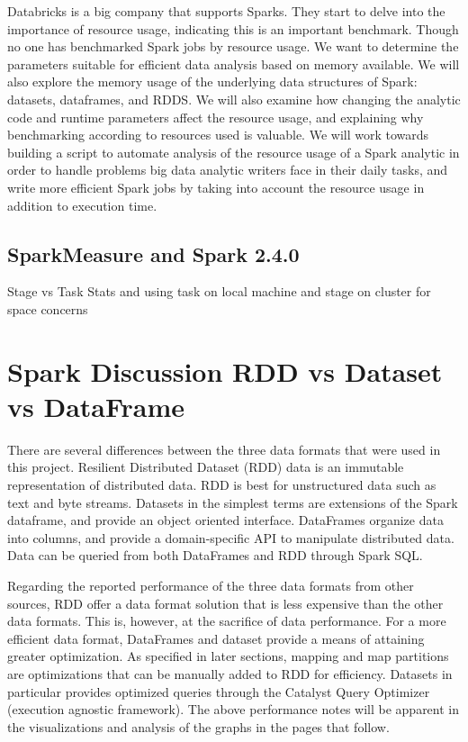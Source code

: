 \documentclass[conference]{IEEEtran}
\begin{document}

Databricks is a big company that supports Sparks. They start to delve into the importance of resource usage, indicating this is an important benchmark. Though no one has benchmarked Spark jobs by resource usage. We want to determine the parameters suitable for efficient data analysis based on memory available. We will also explore the memory usage of the underlying data structures of Spark: datasets, dataframes, and RDDS. We will also examine how changing the analytic code and runtime parameters affect the resource usage, and explaining why benchmarking according to resources used is valuable. We will work towards building a script to automate analysis of the resource usage of a Spark analytic in order to handle problems big data analytic writers face in their daily tasks, and write more efficient Spark jobs by taking into account the resource usage in addition to execution time.


\subsection{SparkMeasure and Spark 2.4.0}

Stage vs Task Stats and using task on local machine and stage on cluster for space concerns

\section{Spark Discussion RDD vs Dataset vs DataFrame}

There are several differences between the three data formats that were used in this project.
Resilient Distributed Dataset (RDD) data is an immutable representation of distributed data.
RDD is best for unstructured data such as text and byte streams.
Datasets in the simplest terms are extensions of the Spark dataframe, and provide an object oriented interface.
DataFrames organize data into columns, and provide a domain-specific API to manipulate distributed data.
Data can be queried from both DataFrames and RDD through Spark SQL.\cite{b1}

Regarding the reported performance of the three data formats from other sources,
RDD offer a data format solution that is less expensive than the other data formats.
This is, however, at the sacrifice of data performance. For a more efficient data format, DataFrames and dataset provide
a means of attaining greater optimization.\cite{b3}
As specified in later sections, mapping and map partitions are optimizations that can be manually added to RDD
for efficiency.
Datasets in particular provides optimized queries through the Catalyst Query Optimizer (execution agnostic framework).
The above performance notes will be apparent in the visualizations and analysis of the graphs in the pages that follow.
\end{document}

